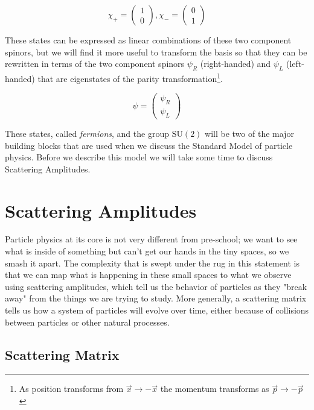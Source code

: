 \begin{equation}
\label{eq:spinors}
\chi_{+} = \begin{pmatrix} 1 \\ 0 \end{pmatrix}, \chi_{-} = \begin{pmatrix} 0\\1\end{pmatrix}
\end{equation}

These states can be expressed as linear combinations of these two component spinors, but we will find it more useful to transform the basis so that they can be rewritten in terms of the two component spinors $\psi_{R}$ (right-handed) and $\psi_{L}$ (left-handed) that are eigenstates of the parity transformation\footnote{As position transforms from $\vec{x} \to -\vec{x}$ the momentum transforms as $\vec{p} \to -\vec{p}$}.

\begin{equation}
\label{eq:TwoRandL}
\psi = \begin{pmatrix} \psi_{R} \\ \psi_{L} \end{pmatrix}
\end{equation}

These states, called \textit{fermions}, and the group $\mathrm{SU}(2)$ will be two of the major building blocks that are used when we discuss the Standard Model of particle physics. Before we describe this model we will take some time to discuss Scattering Amplitudes.

\section{Scattering Amplitudes}
\label{sec:Scattering}

Particle physics at its core is not very different from pre-school; we want to see what is inside of something but can't get our hands in the tiny spaces, so we smash it apart. The complexity that is swept under the rug in this statement is that we can map what is happening in these small spaces to what we observe using scattering amplitudes, which tell us the behavior of particles as they "break away" from the things we are trying to study. More generally, a scattering matrix tells us how a system of particles will evolve over time, either because of collisions between particles or other natural processes.

\subsection{Scattering Matrix}
\label{sec:Smatrix}

